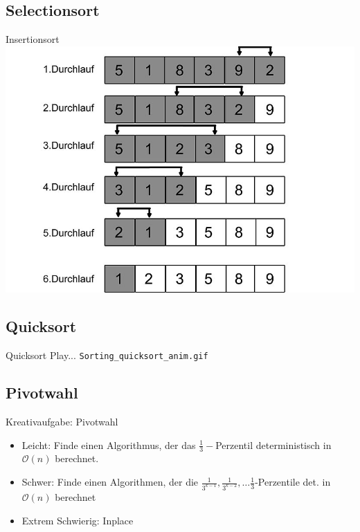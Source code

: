 \documentclass[18pt]{beamer}
\newcommand{\Oh}{\mathcal{O}}
\begin{document}
\subsection{Selectionsort}
\begin{frame}{Insertionsort}
 \includegraphics{SelectionSort}
\end{frame}

\subsection{Quicksort}
\begin{frame}[fragile]{Quicksort}
Play...
\verb|Sorting_quicksort_anim.gif|
\end{frame}

\subsection{Pivotwahl}
\begin{frame}{Kreativaufgabe: Pivotwahl}
 \begin{itemize}
  \item Leicht: Finde einen Algorithmus, der das $\frac{1}{3}-$Perzentil deterministisch in $\Oh(n)$ berechnet.
  \item Schwer: Finde einen Algorithmen, der die $\frac{1}{3^{k-1}}, \frac{1}{3^{k-2}}, \dots \frac{1}{3}$-Perzentile det. in $\Oh(n)$ berechnet
  \item Extrem Schwierig: Inplace
 \end{itemize}

\end{frame}
\end{document}
